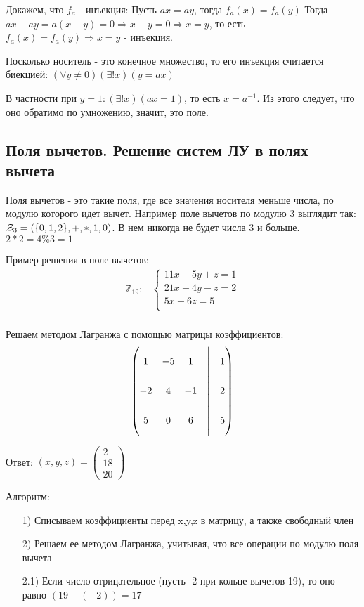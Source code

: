 \documentclass{report}
\begin{document}
Докажем, что $f_a$ - инъекция:\newline
Пусть $ax = ay$, тогда $f_a(x) = f_a(y)$\newline
Тогда $ax - ay = a(x - y) = 0 \Rightarrow x - y = 0 \Rightarrow x = y$, то есть
$f_a(x) = f_a(y) \Rightarrow x = y$ - инъекция.

Посколько носитель - это конечное множество, то его инъекция считается биекцией:
$(\forall y \neq 0)(\exists! x)(y = ax)$

В частности при $y = 1: (\exists! x)(ax = 1)$, то есть $x = a^{-1}$. Из этого
следует, что оно обратимо по умножению, значит, это поле.

\subsection{Поля вычетов. Решение систем ЛУ в полях вычета}
Поля вычетов - это такие поля, где все значения носителя меньше числа, по модулю
которого идет вычет. Например поле вычетов по модулю 3 выглядит так: ${\cal Z}_{3} = (\{0,1,2\}, +, *, 1, 0)$.
В нем никогда не будет числа 3 и больше. $2 * 2 = 4 \% 3 = 1$


Пример решения в поле вычетов:
\begin{align*}
	\mathbb{Z}_{19}: & \begin{cases}
		                   11x - 5y +z = 1  \\
		                   21x + 4y - z = 2 \\
		                   5x - 6z = 5      \\
	                   \end{cases} \\
\end{align*}


Решаем методом Лагранжа с помощью матрицы коэффициентов:
$$
	\left(\begin{matrix}
			1  & -5 & 1  & \Biggr{|} & 1 \\
			-2 & 4  & -1 & \Biggr{|} & 2 \\
			5  & 0  & 6  & \Biggr{|} & 5 \\
		\end{matrix}\right)
$$

Ответ: $(x,y,z) = \begin{pmatrix}
		2 \\18\\20
	\end{pmatrix}$

Алгоритм:
\begin{itemize}
	\item[1)] Списываем коэффициенты перед x,y,z в матрицу, а также свободный член
	\item[2)] Решаем ее методом Лагранжа, учитывая, что все операции по модулю поля вычета
	\item[2.1)] Если число отрицательное (пусть -2 при кольце вычетов 19), то оно равно $(19 + (-2)) = 17$
\end{itemize}
\end{document}
